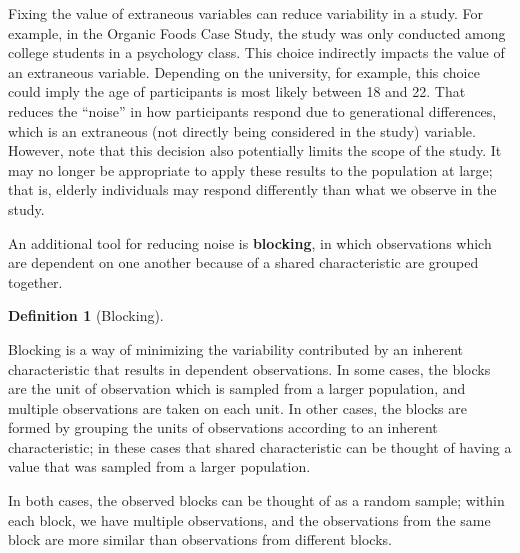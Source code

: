 \documentclass[
  letterpaper,
  DIV=11,
  numbers=noendperiod]{scrreprt}
\theoremstyle{plain}
\theoremstyle{definition}
\theoremstyle{definition}
\newtheorem{definition}{Definition}[chapter]
\theoremstyle{remark}
\begin{document}
Fixing the value of extraneous variables can reduce variability in a
study. For example, in the Organic Foods Case Study, the study was only
conducted among college students in a psychology class. This choice
indirectly impacts the value of an extraneous variable. Depending on the
university, for example, this choice could imply the age of participants
is most likely between 18 and 22. That reduces the ``noise'' in how
participants respond due to generational differences, which is an
extraneous (not directly being considered in the study) variable.
However, note that this decision also potentially limits the scope of
the study. It may no longer be appropriate to apply these results to the
population at large; that is, elderly individuals may respond
differently than what we observe in the study.

An additional tool for reducing noise is \textbf{blocking}, in which
observations which are dependent on one another because of a shared
characteristic are grouped together.

\begin{definition}[Blocking]\protect\hypertarget{def-blocking}{}\label{def-blocking}

Blocking is a way of minimizing the variability contributed by an
inherent characteristic that results in dependent observations. In some
cases, the blocks are the unit of observation which is sampled from a
larger population, and multiple observations are taken on each unit. In
other cases, the blocks are formed by grouping the units of observations
according to an inherent characteristic; in these cases that shared
characteristic can be thought of having a value that was sampled from a
larger population.

In both cases, the observed blocks can be thought of as a random sample;
within each block, we have multiple observations, and the observations
from the same block are more similar than observations from different
blocks.

\end{definition}
\end{document}
